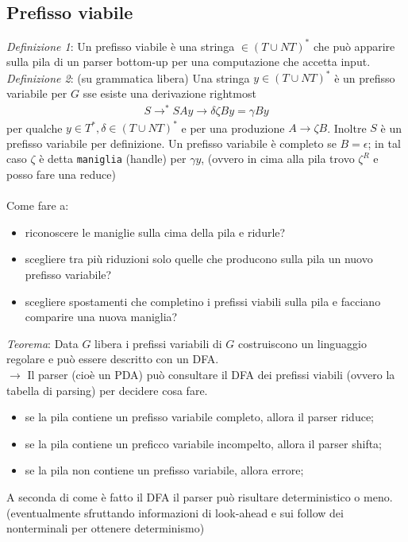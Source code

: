 \documentclass[a4paper,12pt]{article}
\begin{document}
{\subsection{Prefisso viabile}
\textit{Definizione 1}: Un prefisso viabile è una stringa $\in (T \cup NT)^*$ che può apparire sulla pila di un parser bottom-up per una computazione che accetta input. \\
\textit{Definizione 2}: (su grammatica libera) Una stringa $y \in (T \cup NT)^*$ è un prefisso variabile per $G$ sse esiste una derivazione rightmost
\begin{align*}
  S \to^* SAy \to \delta \zeta B y = \gamma By
\end{align*}
per qualche $y \in T^*, \delta \in (T \cup NT)^*$ e per una produzione $A \to \zeta B$. Inoltre $S$ è un prefisso variabile per definizione. Un prefisso variabile è completo se $B = \epsilon$; in tal caso $\zeta$ è detta \texttt{maniglia} (handle) per $\gamma y$, (ovvero in cima alla pila trovo $\zeta^R$ e posso fare una reduce) \\
\vspace{5px} \\
Come fare a:
\begin{itemize}
  \item riconoscere le maniglie sulla cima della pila e ridurle?
  \item scegliere tra più riduzioni solo quelle che producono sulla pila un nuovo prefisso variabile?
  \item scegliere spostamenti che completino i prefissi viabili sulla pila e facciano comparire una nuova maniglia?
\end{itemize}
\textit{Teorema}: Data $G$ libera i prefissi variabili di $G$ costruiscono un linguaggio regolare e può essere descritto con un DFA. \\
$\to$ Il parser (cioè un PDA) può consultare il DFA dei prefissi viabili (ovvero la tabella di parsing) per decidere cosa fare.
\begin{itemize}
  \item se la pila contiene un prefisso variabile completo, allora il parser riduce;
  \item se la pila contiene un preficco variabile incompelto, allora il parser shifta;
  \item se la pila non contiene un prefisso variabile, allora errore;
\end{itemize}
A seconda di come è fatto il DFA il parser può risultare deterministico o meno. (eventualmente sfruttando informazioni di look-ahead e sui follow dei nonterminali per ottenere determinismo) \\
}
\end{document}
